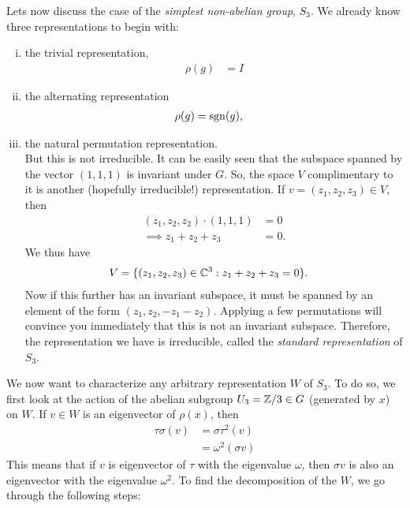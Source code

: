 Lets now discuss the case of the \emph{simplest non-abelian group}, $S_3$. We already know three representations to begin with:
\begin{enumerate}[(i)] 
    \makethislistcompact
    \item the trivial representation,
        \begin{align}
            \rho(g) &= I
        \end{align}
    \item the alternating representation
        \begin{align}
            \rho(g) &= \operatorname{sgn}(g),
        \end{align}
    \item the natural permutation representation.\\
        But this is not irreducible. It can be easily seen that the subspace spanned by the vector $(1,1,1)$ is invariant under $G$. So, the space $V$ complimentary to it is another (hopefully irreducible!) representation. If $v=(z_1,z_2,z_3) \in V$, then 
        \begin{align}
            (z_1,z_2,z_2)\cdot(1,1,1) &= 0\\
            \implies z_1 + z_2 + z_3 &= 0.
        \end{align}
        We thus have
        \begin{align}
            V &= \{(z_1,z_2,z_3) \in \mathbb{C}^3: z_1 + z_2 + z_3 =0\}.
        \end{align}
        Now if this further has an invariant subspace, it must be spanned by an element of the form $(z_1,z_2,-z_1-z_2)$. Applying a few permutations will convince you immediately that this is not an invariant subspace. Therefore, the representation we have is irreducible, called the \emph{standard representation} of $S_3$.
\end{enumerate}
We now want to characterize any arbitrary representation $W$ of $S_3$. To do so, we first look at the action of the abelian subgroup $ U_3 = \mathbb{Z}/3 \in G$ (generated by $x$) on $W$. If $v\in W$ is an eigenvector of $\rho(x)$, then 
\begin{align}
    \tau \sigma (v) &= \sigma\tau^2 (v)\\
        &= \omega^2 (\sigma v)
\end{align}
This means that if $v$ is eigenvector of $\tau$ with the eigenvalue $\omega$, then $\sigma v$ is also an eigenvector with the eigenvalue $\omega^2$.
To find the decomposition of the $W$, we go through the following steps:
